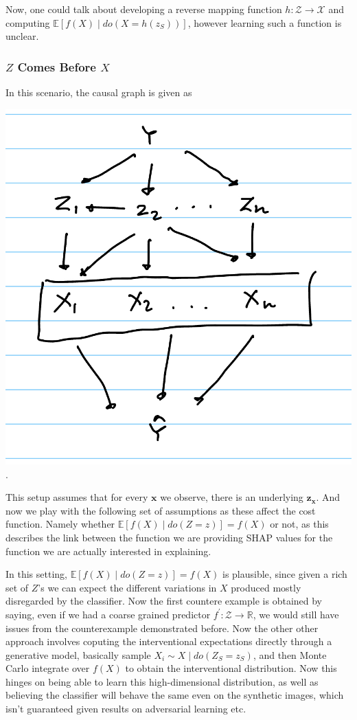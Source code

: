 \documentclass{article}
\begin{document}
Now, one could talk about developing a reverse mapping function $h: \mathcal{Z} \rightarrow \mathcal{X}$ and computing $\mathbb{E}[f(X) \mid do(X = h(z_S))]$, however learning such a function is unclear. 

\subsubsection{$Z$ Comes Before $X$}

In this scenario, the causal graph is given as

\begin{center}
\includegraphics[scale = 0.2]{Z_before_X.jpeg}. 
\end{center}

This setup assumes that for every $\mathbf{x}$  we observe, there is an underlying $\mathbf{z}_\mathbf{x}$. And now we play with the following set of assumptions as these affect the cost function. Namely whether $
\mathbb{E}[f(X) \mid do(Z = z)] = f(X)$ or not, as this describes the link between the function we are providing SHAP values for the function we are actually interested in explaining. 

In this setting, $\mathbb{E}[f(X) \mid do(Z = z)] = f(X)$ is plausible, since given a rich set of $Z$'s we can expect the different variations in $X$ produced mostly disregarded by the classifier. Now the first countere example is obtained by saying, even if we had a coarse grained predictor $f^\prime : \mathcal{Z} \rightarrow \mathbb{R}$, we would still have issues from the counterexample demonstrated before. Now the other other approach involves coputing the interventional expectations directly through a generative model, basically sample $X_i \sim X \mid do(Z_S = z_S)$, and then Monte Carlo integrate over $f(X)$ to obtain the interventional distribution. Now this hinges on being able to learn this high-dimensional distribution, as well as believing the classifier will behave the same even on the synthetic images, which isn't guaranteed given results on adversarial learning etc.
\end{document}

